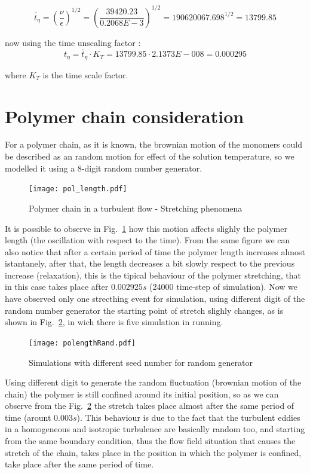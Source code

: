\[
\tilde{t_{\eta}} = \left( \frac{\nu}{\epsilon} \right)^{1/2} = \left( \frac{39420.23}{0.2068E−3} \right)^{1/2} = 190620067.698^{1/2} = 13799.85
\]

now using the time unscaling factor :
\[t_{\eta} = \tilde{t_{\eta}} \cdot K_T = 13799.85 \cdot 2.1373E-008 = \mathbf{0.000295}\]

where $K_T$ is the time scale factor.
\section{Polymer chain consideration}

For a polymer chain, as it is known, the brownian motion of the monomers could be described as an random motion  for effect of the solution temperature, so we modelled it using a 8-digit random number generator. 


\begin{figure}[h!]
\centering
\texttt{[image: pol\_length.pdf]}

\caption{Polymer chain in a turbulent flow - Stretching phenomena}
\label{polength}
\end{figure}

It is possible to observe in Fig.~\ref{polength} how this motion affects slighly the polymer length (the oscillation with respect to the time).
From the same figure we can also notice that after a certain period of time the polymer length increases almost istantanely, after that, the length decreases a bit slowly respect to the previous increase (relaxation), this is the tipical behaviour of the polymer stretching, that in this case takes place after $0.002925 s$ (24000 time-step of simulation).
Now we have observed only one strecthing event for simulation, using different digit of the random number generator the starting point of stretch slighly changes, as is shown in Fig.~\ref{rand}, in wich there is five simulation in running.   

\begin{figure}[h!]
\centering
\texttt{[image: polengthRand.pdf]}
\caption{Simulations with different seed number for random generator}
\label{rand}
\end{figure}

Using different digit to generate the random fluctuation (brownian motion of the chain) the polymer is still confined around its initial position, so as we can observe from the Fig.~\ref{rand} the stretch takes place 
almost after the same period of time (arount 0.003$s$). This behaviour is due to the fact that the turbulent eddies in a homogeneous and isotropic turbulence are basically random too, and starting from the same boundary condition, thus the flow field situation that causes the stretch of the chain, takes place in the position in which the polymer is confined, take place after the same period of time. %

